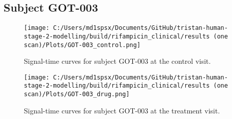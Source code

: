 \documentclass{epflreport}%
\begin{document}
\subsection{Subject GOT{-}003}%
\label{subsec:SubjectGOT{-}003}%

%


\begin{figure}[h!]%
\centering%
\texttt{[image: C:/Users/md1spsx/Documents/GitHub/tristan-human-stage-2-modelling/build/rifampicin\_clinical/results (one scan)/Plots/GOT-003\_control.png]}%
\caption{Signal{-}time curves for subject GOT{-}003 at the control visit.}%
\end{figure}

%


\begin{figure}[h!]%
\centering%
\texttt{[image: C:/Users/md1spsx/Documents/GitHub/tristan-human-stage-2-modelling/build/rifampicin\_clinical/results (one scan)/Plots/GOT-003\_drug.png]}%
\caption{Signal{-}time curves for subject GOT{-}003 at the treatment visit.}%
\end{figure}
\end{document}
